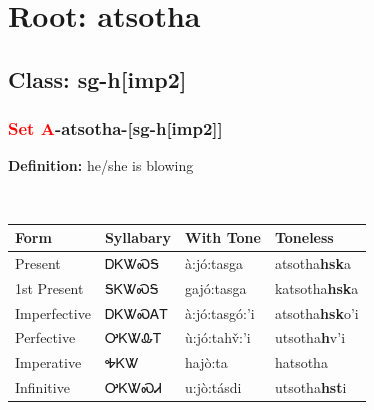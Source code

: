 \needspace{4in}
\section*{Root: atsotha}
\nopagebreak
{}
\needspace{3in}
\subsection*{Class: sg-h[imp2]}
\nopagebreak
\needspace{2in}
\subsubsection*{\textcolor{Red}{Set A}{-}\textbf{atsotha}{-}[sg-h[imp2]]}
\nopagebreak
\textbf{Definition: } he/she is blowing
\\[0.5em]
\begin{tabularx}{\textwidth}{l X X X}%
\toprule%
\textbf{Form}&\textbf{Syllabary}&\textbf{With Tone}&\textbf{Toneless}\\%
\midrule%
Present&ᎠᏦᏔᏍᎦ&à:jó:tasga&atsotha\textbf{hsk}a\\%
1st Present&ᎦᏦᏔᏍᎦ&gajó:tasga&katsotha\textbf{hsk}a\\%
Imperfective&ᎠᏦᏔᏍᎪᎢ&à:jó:tasgó:’i&atsotha\textbf{hsk}o'i\\%
Perfective&ᎤᏦᏔᎲᎢ&ù:jó:tahv̌:’i&utsotha\textbf{h}v'i\\%
Imperative&ᎭᏦᏔ&hajò:ta&hatsotha\textbf{}\\%
Infinitive&ᎤᏦᏔᏍᏗ&u:jò:tásdi&utsotha\textbf{hst}i\\%
\bottomrule%
\end{tabularx}
\\[1em]